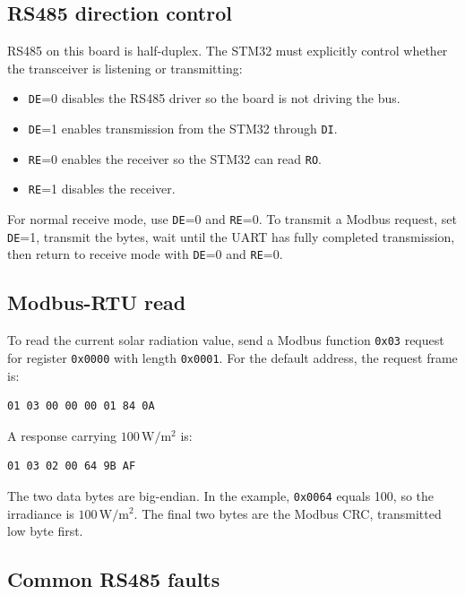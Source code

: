 \documentclass[11pt,a4paper]{article}
\newcommand{\code}[1]{\texttt{#1}}
\begin{document}
\subsection{RS485 direction control}

RS485 on this board is half-duplex. The STM32 must explicitly control whether the transceiver is listening or transmitting:
\begin{itemize}
  \item \code{DE}=0 disables the RS485 driver so the board is not driving the bus.
  \item \code{DE}=1 enables transmission from the STM32 through \code{DI}.
  \item \code{RE}=0 enables the receiver so the STM32 can read \code{RO}.
  \item \code{RE}=1 disables the receiver.
\end{itemize}

For normal receive mode, use \code{DE}=0 and \code{RE}=0. To transmit a Modbus request, set \code{DE}=1, transmit the bytes, wait until the UART has fully completed transmission, then return to receive mode with \code{DE}=0 and \code{RE}=0.

\subsection{Modbus-RTU read}

To read the current solar radiation value, send a Modbus function \code{0x03} request for register \code{0x0000} with length \code{0x0001}. For the default address, the request frame is:

\begin{lstlisting}[caption={SEN0640 read-irradiance request bytes}]
01 03 00 00 00 01 84 0A
\end{lstlisting}

A response carrying $100\,\mathrm{W/m^2}$ is:

\begin{lstlisting}[caption={Example SEN0640 response bytes}]
01 03 02 00 64 9B AF
\end{lstlisting}

The two data bytes are big-endian. In the example, \code{0x0064} equals 100, so the irradiance is $100\,\mathrm{W/m^2}$. The final two bytes are the Modbus CRC, transmitted low byte first.

\subsection{Common RS485 faults}
\end{document}
